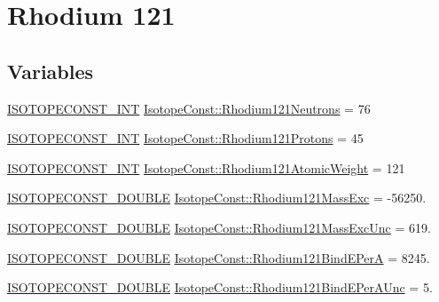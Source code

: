 \hypertarget{group___isotope_const-_rhodium-_rh121}{}\section{Rhodium 121}
\label{group___isotope_const-_rhodium-_rh121}
\subsection*{Variables}
\begin{DoxyCompactItemize}
\item 
\mbox{\hyperlink{group___isotope_const-_macros_ga5f18360b3e99483a35c32d789e62621c}{I\+S\+O\+T\+O\+P\+E\+C\+O\+N\+S\+T\+\_\+\+I\+NT}} \mbox{\hyperlink{group___isotope_const-_rhodium-_rh121_ga236703dbd56208a035f2334c974a7f15}{Isotope\+Const\+::\+Rhodium121\+Neutrons}} = 76
\item 
\mbox{\hyperlink{group___isotope_const-_macros_ga5f18360b3e99483a35c32d789e62621c}{I\+S\+O\+T\+O\+P\+E\+C\+O\+N\+S\+T\+\_\+\+I\+NT}} \mbox{\hyperlink{group___isotope_const-_rhodium-_rh121_ga180b0e00ca801a25e5c37c1f0a2887c1}{Isotope\+Const\+::\+Rhodium121\+Protons}} = 45
\item 
\mbox{\hyperlink{group___isotope_const-_macros_ga5f18360b3e99483a35c32d789e62621c}{I\+S\+O\+T\+O\+P\+E\+C\+O\+N\+S\+T\+\_\+\+I\+NT}} \mbox{\hyperlink{group___isotope_const-_rhodium-_rh121_ga11f5b4521c55b3405a3ca0584f83850a}{Isotope\+Const\+::\+Rhodium121\+Atomic\+Weight}} = 121
\item 
\mbox{\hyperlink{group___isotope_const-_macros_ga8f45a7272ce02c0b4c65c44636ed719a}{I\+S\+O\+T\+O\+P\+E\+C\+O\+N\+S\+T\+\_\+\+D\+O\+U\+B\+LE}} \mbox{\hyperlink{group___isotope_const-_rhodium-_rh121_gabbfec75ffb23f823a6f9a31f8a080130}{Isotope\+Const\+::\+Rhodium121\+Mass\+Exc}} = -\/56250.
\item 
\mbox{\hyperlink{group___isotope_const-_macros_ga8f45a7272ce02c0b4c65c44636ed719a}{I\+S\+O\+T\+O\+P\+E\+C\+O\+N\+S\+T\+\_\+\+D\+O\+U\+B\+LE}} \mbox{\hyperlink{group___isotope_const-_rhodium-_rh121_gae3d727add4b5c76356ded403cddf50bb}{Isotope\+Const\+::\+Rhodium121\+Mass\+Exc\+Unc}} = 619.
\item 
\mbox{\hyperlink{group___isotope_const-_macros_ga8f45a7272ce02c0b4c65c44636ed719a}{I\+S\+O\+T\+O\+P\+E\+C\+O\+N\+S\+T\+\_\+\+D\+O\+U\+B\+LE}} \mbox{\hyperlink{group___isotope_const-_rhodium-_rh121_ga1360fd79ef0b1c4bcc3f90029165e787}{Isotope\+Const\+::\+Rhodium121\+Bind\+E\+PerA}} = 8245.
\item 
\mbox{\hyperlink{group___isotope_const-_macros_ga8f45a7272ce02c0b4c65c44636ed719a}{I\+S\+O\+T\+O\+P\+E\+C\+O\+N\+S\+T\+\_\+\+D\+O\+U\+B\+LE}} \mbox{\hyperlink{group___isotope_const-_rhodium-_rh121_gaa68bc1400471834ff74c88ac5b5c82e2}{Isotope\+Const\+::\+Rhodium121\+Bind\+E\+Per\+A\+Unc}} = 5.

\end{DoxyCompactItemize}
